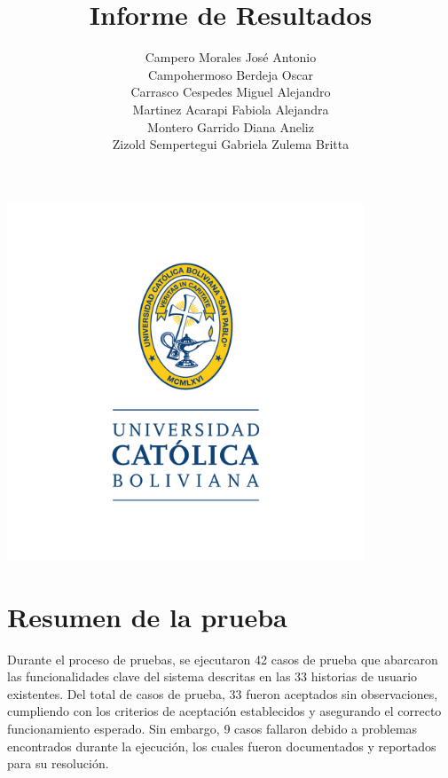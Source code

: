 \documentclass[stu, 12pt, letterpaper, donotrepeattitle, floatsintext, natbib]{apa7}
\title{\Large Informe de Resultados }
\author{
    Campero Morales José Antonio \\
    Campohermoso Berdeja Oscar \\
    Carrasco Cespedes Miguel Alejandro \\
    Martinez Acarapi Fabiola Alejandra \\
    Montero Garrido Diana Aneliz \\
    Zizold Sempertegui Gabriela Zulema Britta
}
\affiliation{Universidad Católica Boliviana}
\begin{document}
\thispagestyle{empty}

\centering
\includegraphics[width=0.8\textwidth]{../imgs/logo-ucb.png} %
\vspace{-5cm} %

\maketitle

\newpage
{}
\renewcommand\contentsname{\large Índice}
\tableofcontents
\setcounter{tocdepth}{2}
\newpage
\renewcommand{\listfigurename}{\large Índice de figuras}
\listoffigures
\newpage
\renewcommand{\listtablename}{\large Índice de tablas}
\listoftables
\newpage

\newpage
\section{\large Resumen de la prueba}
Durante el proceso de pruebas, se ejecutaron 42 casos de prueba que abarcaron las funcionalidades clave del sistema descritas en las 33 historias de usuario existentes. Del total de casos de prueba, 33 fueron aceptados sin observaciones, cumpliendo con los criterios de aceptación establecidos y asegurando el correcto funcionamiento esperado. Sin embargo, 9 casos fallaron debido a problemas encontrados durante la ejecución, los cuales fueron documentados y reportados para su resolución. 
\end{document}
